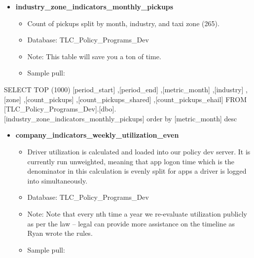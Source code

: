 \documentclass[
]{book}
\newenvironment{Shaded}{\begin{snugshade}}{\end{snugshade}}
\newcommand{\DecValTok}[1]{\textcolor[rgb]{0.00,0.00,0.81}{#1}}
\newcommand{\FunctionTok}[1]{\textcolor[rgb]{0.00,0.00,0.00}{#1}}
\newcommand{\NormalTok}[1]{#1}
\providecommand{\tightlist}{%
  \setlength{\itemsep}{0pt}\setlength{\parskip}{0pt}}
\begin{document}
\begin{itemize}
\tightlist
\item
  \textbf{industry\_zone\_indicators\_monthly\_pickups}

  \begin{itemize}
  \tightlist
  \item
    Count of pickups split by month, industry, and taxi zone (265).
  \item
    Database: TLC\_Policy\_Programs\_Dev
  \item
    Note: This table will save you a ton of time.
  \item
    Sample pull:
  \end{itemize}
\end{itemize}

\begin{Shaded}
\begin{Highlighting}[]
\NormalTok{SELECT }\FunctionTok{TOP}\NormalTok{ (}\DecValTok{1000}\NormalTok{) [period\_start]}
\NormalTok{      ,[period\_end]}
\NormalTok{      ,[metric\_month]}
\NormalTok{      ,[industry]}
\NormalTok{      ,[zone]}
\NormalTok{      ,[count\_pickups]}
\NormalTok{      ,[count\_pickups\_shared]}
\NormalTok{      ,[count\_pickups\_ehail]}
\NormalTok{  FROM [TLC\_Policy\_Programs\_Dev].[dbo].[industry\_zone\_indicators\_monthly\_pickups]}
\NormalTok{  order by [metric\_month] desc}
\end{Highlighting}
\end{Shaded}

\begin{itemize}
\tightlist
\item
  \textbf{company\_indicators\_weekly\_utilization\_even}

  \begin{itemize}
  \tightlist
  \item
    Driver utilization is calculated and loaded into our policy dev server. It is currently run unweighted, meaning that app logon time which is the denominator in this calculation is evenly split for apps a driver is logged into simultaneously.
  \item
    Database: TLC\_Policy\_Programs\_Dev
  \item
    Note: Note that every nth time a year we re-evaluate utilization publicly as per the law -- legal can provide more assistance on the timeline as Ryan wrote the rules.
  \item
    Sample pull:
  \end{itemize}
\end{itemize}
\end{document}
